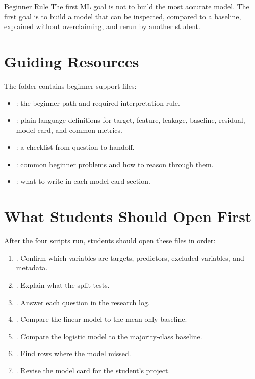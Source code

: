 \begin{programbox}{Beginner Rule}
The first ML goal is not to build the most accurate model. The first goal is to build a model that can be inspected, compared to a baseline, explained without overclaiming, and rerun by another student.
\end{programbox}

\section{Guiding Resources}

The  folder contains beginner support files:
\begin{itemize}
  \item {}: the beginner path and required interpretation rule.
  \item {}: plain-language definitions for target, feature, leakage, baseline, residual, model card, and common metrics.
  \item {}: a checklist from question to handoff.
  \item {}: common beginner problems and how to reason through them.
  \item {}: what to write in each model-card section.
\end{itemize}

\section{What Students Should Open First}

After the four scripts run, students should open these files in order:
\begin{enumerate}
  \item {}. Confirm which variables are targets, predictors, excluded variables, and metadata.
  \item {}. Explain what the split tests.
  \item {}. Answer each question in the research log.
  \item {}. Compare the linear model to the mean-only baseline.
  \item {}. Compare the logistic model to the majority-class baseline.
  \item {}. Find rows where the model missed.
  \item {}. Revise the model card for the student's project.
\end{enumerate}

